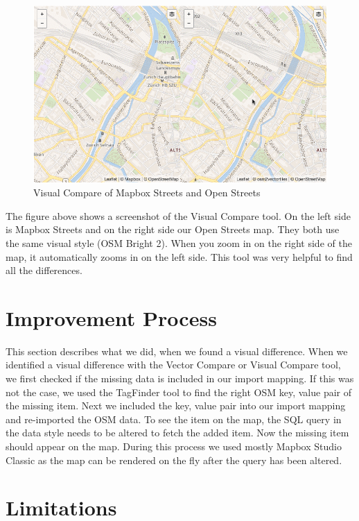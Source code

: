 \begin{figure}[H]
\centering
  \includegraphics[width=1\textwidth]{images/visual_compare.png}
  \caption{Visual Compare of Mapbox Streets and Open Streets}
\end{figure}

The figure above shows a screenshot of the Visual Compare tool. On the left side is Mapbox Streets and on the right side our Open Streets map. They both use the same visual style (OSM Bright 2\cite{92_github_2015}). When you zoom in on the right side of the map, it automatically zooms in on the left side. This tool was very helpful to find all the differences.

\section{Improvement Process}

This section describes what we did, when we found a visual difference. When we identified a visual difference with the Vector Compare or Visual Compare tool, we first checked if the missing data is included in our import mapping. If this was not the case, we used the TagFinder tool\cite{93_wiki.openstreetmap.org_2015} to find the right OSM key, value pair of the missing item. Next we included the key, value pair into our import mapping and re-imported the OSM data. To see the item on the map, the SQL query in the data style needs to be altered to fetch the added item. Now the missing item should appear on the map. During this process we used mostly Mapbox Studio Classic\cite{mapbox_studio_classic} as the map can be rendered on the fly after the query has been altered.

\section{Limitations}\label{project_limitations}

